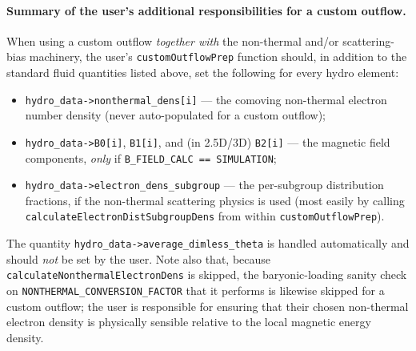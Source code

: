 \documentclass[12pt,a4paper]{article}
\begin{document}
\paragraph{Summary of the user's additional responsibilities for a custom outflow.}
When using a custom outflow \emph{together with} the non-thermal and/or scattering-bias machinery, the user's \texttt{customOutflowPrep} function should, in addition to the standard fluid quantities listed above, set the following for every hydro element:
\begin{itemize}
	\item \texttt{hydro\_data->nonthermal\_dens[i]} --- the comoving non-thermal electron number density (never auto-populated for a custom outflow);
	\item \texttt{hydro\_data->B0[i]}, \texttt{B1[i]}, and (in 2.5D/3D) \texttt{B2[i]} --- the magnetic field components, \emph{only} if \texttt{B\_FIELD\_CALC == SIMULATION};
	\item \texttt{hydro\_data->electron\_dens\_subgroup} --- the per-subgroup distribution fractions, if the non-thermal scattering physics is used (most easily by calling \texttt{calculateElectronDistSubgroupDens} from within \texttt{customOutflowPrep}).
\end{itemize}
The quantity \texttt{hydro\_data->average\_dimless\_theta} is handled automatically and should \emph{not} be set by the user. Note also that, because \texttt{calculateNonthermalElectronDens} is skipped, the baryonic-loading sanity check on \texttt{NONTHERMAL\_CONVERSION\_FACTOR} that it performs is likewise skipped for a custom outflow; the user is responsible for ensuring that their chosen non-thermal electron density is physically sensible relative to the local magnetic energy density.
\end{document}
